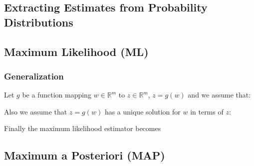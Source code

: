 \documentclass[10pt,a4paper]{scrartcl}
\begin{document}
\begin{multicols*}{2}
\begin{multicols*}{3}
\section{Extracting Estimates from Probability Distributions}

\subsection{Maximum Likelihood (ML)}



\subsubsection{Generalization}


Let $g$ be a function mapping $w\in\mathbb{R}^m$ to $z\in\mathbb{R}^m$, $z=g(w)$ and we assume that: 


Also we assume that $z=g(w)$ has a unique solution for $w$ in terms of $z$:


Finally the maximum likelihood estimator becomes 


\subsection{Maximum a Posteriori (MAP)}


\end{multicols*}
\end{multicols*}
\end{document}
